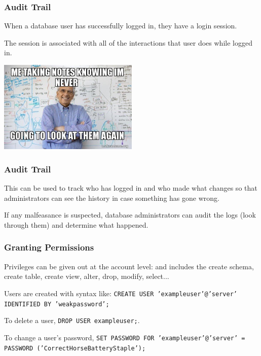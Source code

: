 \begin{frame}
\frametitle{Audit Trail}

When a database user has successfully logged in, they have a \alert{login session}.

The session is associated with all of the interactions that user does while logged in. 

\begin{center}
	\includegraphics[width=0.5\textwidth]{images/notes.jpg}
\end{center}

\end{frame}



\begin{frame}
\frametitle{Audit Trail}

This can be used to track who has logged in and who made what changes so that administrators can see the history in case something has gone wrong. 

If any malfeasance is suspected, database administrators can audit the logs (look through them) and determine what happened.  


\end{frame}



\begin{frame}
\frametitle{Granting Permissions}

Privileges can be given out at the account level: and includes the create schema, create table, create view, alter, drop, modify, select... 

Users are created with syntax like: \texttt{CREATE USER 'exampleuser'@'server' IDENTIFIED BY 'weakpassword';} 

To delete a user, \texttt{DROP USER exampleuser;}. 
 
To change a user's password, \texttt{SET PASSWORD FOR 'exampleuser'@'server' = PASSWORD ('CorrectHorseBatteryStaple');}

\end{frame}



